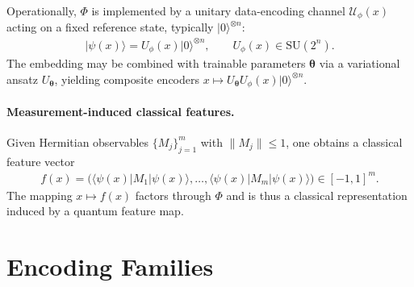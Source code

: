 \documentclass[11pt]{article}
\begin{document}
Operationally, \(\Phi\) is implemented by a unitary data-encoding channel \(\mathcal{U}_\phi(x)\) acting on a fixed reference state, typically \(\lvert 0\rangle^{\otimes n}\):
\begin{align}
  \lvert \psi(x) \rangle 
  = U_\phi(x) \lvert 0 \rangle^{\otimes n},
  \qquad U_\phi(x)\in \mathrm{SU}(2^n).\label{eq:unitary-embedding}
\end{align}
The embedding may be combined with trainable parameters \(\bm{\theta}\) via a variational ansatz \(U_{\bm{\theta}}\), yielding composite encoders \(x\mapsto U_{\bm{\theta}} U_\phi(x) \lvert 0\rangle^{\otimes n}\).

\paragraph{Measurement-induced classical features.}
Given Hermitian observables \(\{M_j\}_{j=1}^m\) with \(\lVert M_j\rVert\le 1\), one obtains a classical feature vector
\begin{align}
  f(x) 
  = \big( \langle \psi(x) \rvert M_1 \lvert \psi(x) \rangle,\dots, \langle \psi(x) \rvert M_m \lvert \psi(x) \rangle \big)
  \in [-1,1]^m.\label{eq:meas-features}
\end{align}
The mapping \(x\mapsto f(x)\) factors through \(\Phi\) and is thus a classical representation induced by a quantum feature map.

\section{Encoding Families}
\end{document}
